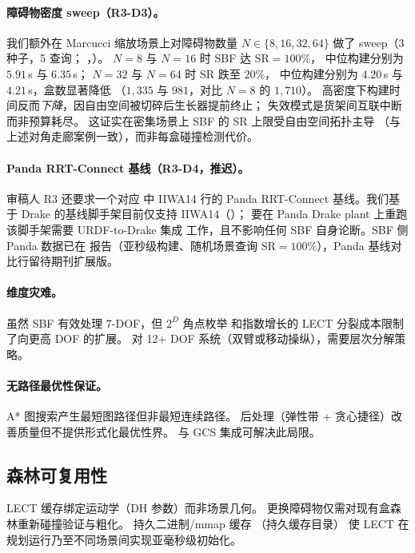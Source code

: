\documentclass[journal]{IEEEtran}
\begin{document}
\paragraph{障碍物密度 sweep（R3-D3）。}
我们额外在 Marcucci 缩放场景上对障碍物数量
$N\!\in\!\{8,16,32,64\}$ 做了 sweep（3 种子，5 查询；
，）。
$N\!=\!8$ 与 $N\!=\!16$ 时 SBF 达 $\text{SR}=100\%$，
中位构建分别为 $5.91$\,s 与 $6.35$\,s；
$N\!=\!32$ 与 $N\!=\!64$ 时 SR 跌至 $20\%$，
中位构建分别为 $4.20$\,s 与 $4.21$\,s，盒数显著降低
（$1{,}335$ 与 $981$，对比 $N\!=\!8$ 的 $1{,}710$）。
高密度下构建时间反而\emph{下降}，因自由空间被切碎后生长器提前终止；
失效模式是货架间互联中断而非预算耗尽。
这证实在密集场景上 SBF 的 SR 上限受自由空间拓扑主导
（与上述对角走廊案例一致），而非每盒碰撞检测代价。

\paragraph{Panda RRT-Connect 基线（R3-D4，推迟）。}
审稿人 R3 还要求一个对应  中 IIWA14 行的
Panda RRT-Connect 基线。我们基于 Drake 的基线脚手架目前仅支持
IIWA14（）；
要在 Panda Drake plant 上重跑该脚手架需要 URDF-to-Drake 集成
工作，且不影响任何 SBF 自身论断。SBF 侧 Panda 数据已在
 报告（亚秒级构建、随机场景查询
$\text{SR}=100\%$），Panda 基线对比行留待期刊扩展版。

\paragraph{维度灾难。}
虽然 SBF 有效处理 7-DOF，但 $2^D$ 角点枚举
和指数增长的 LECT 分裂成本限制了向更高 DOF 的扩展。
对 12+ DOF 系统（双臂或移动操纵），需要层次分解策略。

\paragraph{无路径最优性保证。}
A* 图搜索产生最短图路径但非最短连续路径。
后处理（弹性带 + 贪心捷径）改善质量但不提供形式化最优性界。
与 GCS 集成可解决此局限。

\subsection{森林可复用性}

LECT 缓存绑定运动学（DH 参数）而非场景几何。
更换障碍物仅需对现有盒森林重新碰撞验证与粗化。
持久二进制/mmap 缓存
（持久缓存目录）
使 LECT 在规划运行乃至不同场景间实现亚毫秒级初始化。
\end{document}
